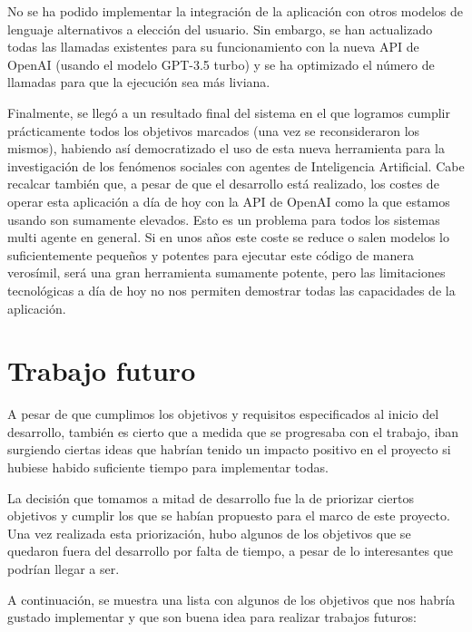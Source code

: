 No se ha podido implementar la integración de la aplicación con otros modelos de lenguaje alternativos a elección del usuario. Sin embargo, se han actualizado todas las llamadas existentes para su funcionamiento con la nueva API de OpenAI (usando el modelo GPT-3.5 turbo) y se ha optimizado el número de llamadas para que la ejecución sea más liviana.

Finalmente, se llegó a un resultado final del sistema en el que logramos cumplir prácticamente todos los objetivos marcados (una vez se reconsideraron los mismos), habiendo así democratizado el uso de esta nueva herramienta para la investigación de los fenómenos sociales con agentes de Inteligencia Artificial. Cabe recalcar también que, a pesar de que el desarrollo está realizado, los costes de operar esta aplicación a día de hoy con la API de OpenAI como la que estamos usando son sumamente elevados. Esto es un problema para todos los sistemas multi agente en general. Si en unos años este coste se reduce o salen modelos lo suficientemente pequeños y potentes para ejecutar este código de manera verosímil, será una gran herramienta sumamente potente, pero las limitaciones tecnológicas a día de hoy no nos permiten demostrar todas las capacidades de la aplicación.

\section{Trabajo futuro}

A pesar de que cumplimos los objetivos y requisitos especificados al inicio del desarrollo, también es cierto que a medida que se progresaba con el trabajo, iban surgiendo ciertas ideas que habrían tenido un impacto positivo en el proyecto si hubiese habido suficiente tiempo para implementar todas.

La decisión que tomamos a mitad de desarrollo fue la de priorizar ciertos objetivos y cumplir los que se habían propuesto para el marco de este proyecto. Una vez realizada esta priorización, hubo algunos de los objetivos que se quedaron fuera del desarrollo por falta de tiempo, a pesar de lo interesantes que podrían llegar a ser.

A continuación, se muestra una lista con algunos de los objetivos que nos habría gustado implementar y que son buena idea para realizar trabajos futuros:

